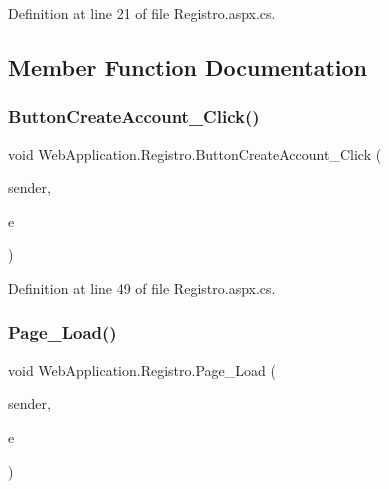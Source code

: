 Definition at line 21 of file Registro.\+aspx.\+cs.



\subsection{Member Function Documentation}
\mbox{\label{classWebApplication_1_1Registro_a7189efc9ef450f0288049e1089719b86}} 
\subsubsection{\texorpdfstring{ButtonCreateAccount\_Click()}{ButtonCreateAccount\_Click()}}
{\footnotesize\ttfamily void Web\+Application.\+Registro.\+Button\+Create\+Account\+\_\+\+Click (\begin{DoxyParamCaption}\item[{object}]{sender,  }\item[{Event\+Args}]{e }\end{DoxyParamCaption})\hspace{0.3cm}{\ttfamily [protected]}}



Definition at line 49 of file Registro.\+aspx.\+cs.

\mbox{\label{classWebApplication_1_1Registro_a78c6a12b73bcc3a6b4c4a2fee7cf0698}} 
\subsubsection{\texorpdfstring{Page\_Load()}{Page\_Load()}}
{\footnotesize\ttfamily void Web\+Application.\+Registro.\+Page\+\_\+\+Load (\begin{DoxyParamCaption}\item[{object}]{sender,  }\item[{Event\+Args}]{e }\end{DoxyParamCaption})\hspace{0.3cm}{\ttfamily [protected]}}



